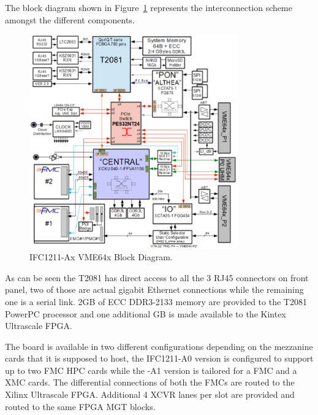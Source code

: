 \documentclass[11pt
  , a4paper
  , article
  , oneside
  , showtrims
]{memoir}
\begin{document}
The block diagram shown in Figure~\ref{fig:ifc1211_bd} represents the interconnection scheme amongst the different components.

\begin{figure}[!htb]
	\centering
	\includegraphics[width=0.80\textwidth]{./pictures/IOxOS_IFC1211_bd.eps}
	\caption{
		IFC1211-Ax VME64x Block Diagram.
	}
	\label{fig:ifc1211_bd}   
\end{figure}

As can be seen the T2081 has direct access to all the 3 RJ45 connectors on front panel, two of those are actual gigabit Ethernet connections while the remaining one is a serial link.
2GB of ECC DDR3-2133 memory are provided to the T2081 PowerPC processor and one additional GB is made available to the Kintex Ultrascale FPGA.

The board is available in two different configurations depending on the mezzanine cards that it is supposed to host, the IFC1211-A0 version is configured to support up to two FMC HPC cards while the -A1 version is tailored for a FMC and a XMC cards.
The differential connections of both the FMCs are routed to the Xilinx Ultrascale FPGA. Additional 4 XCVR lanes per slot are provided and routed to the same FPGA MGT blocks.

\end{document}

